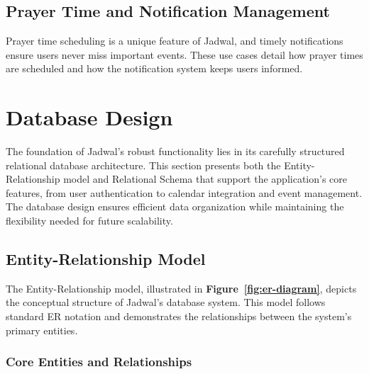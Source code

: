 \documentclass[12pt,a4paper,twoside]{report}
\begin{document}
\subsection{Prayer Time and Notification Management}
Prayer time scheduling is a unique feature of Jadwal, and timely notifications ensure users never miss important events. These use cases detail how prayer times are scheduled and how the notification system keeps users informed.









\section{Database Design}

The foundation of Jadwal's robust functionality lies in its carefully structured relational database architecture. This section presents both the Entity-Relationship model and Relational Schema that support the application's core features, from user authentication to calendar integration and event management. The database design ensures efficient data organization while maintaining the flexibility needed for future scalability.

\subsection{Entity-Relationship Model}

The Entity-Relationship model, illustrated in \textbf{Figure~\ref{fig:er-diagram}}, depicts the conceptual structure of Jadwal's database system. This model follows standard ER notation and demonstrates the relationships between the system's primary entities.

\subsubsection{Core Entities and Relationships}
\end{document}
